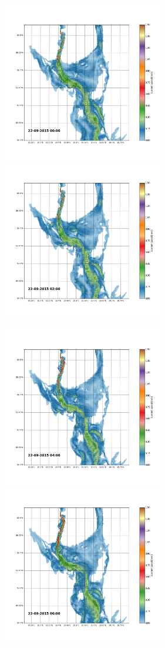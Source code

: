 \documentclass[12pt,a4paper,english]{article}
\begin{document}
\begin{figure}[h]
\centerline{
\includegraphics*[trim=2.0cm 3cm 6.0cm 3.5cm,clip=true,height=7cm]{Python/stromfelt_82}
\includegraphics*[trim=3.7cm 3cm 1.3cm 3.5cm,clip=true,height=7cm]{Python/stromfelt_84}
}
\centerline{
\includegraphics*[trim=2.0cm 3cm 6.0cm 3.5cm,clip=true,height=7cm]{Python/stromfelt_86}
\includegraphics*[trim=3.7cm 3cm 1.3cm 3.5cm,clip=true,height=7cm]{Python/stromfelt_88}
}
\end{figure}
\end{document}

